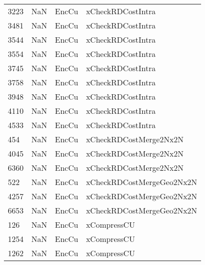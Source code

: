 \begin{tabular}{llll}
3223 &                   NaN &                      EncCu &                         xCheckRDCostIntra \\
3481 &                   NaN &                      EncCu &                         xCheckRDCostIntra \\
3544 &                   NaN &                      EncCu &                         xCheckRDCostIntra \\
3554 &                   NaN &                      EncCu &                         xCheckRDCostIntra \\
3745 &                   NaN &                      EncCu &                         xCheckRDCostIntra \\
3758 &                   NaN &                      EncCu &                         xCheckRDCostIntra \\
3948 &                   NaN &                      EncCu &                         xCheckRDCostIntra \\
4110 &                   NaN &                      EncCu &                         xCheckRDCostIntra \\
4533 &                   NaN &                      EncCu &                         xCheckRDCostIntra \\
454  &                   NaN &                      EncCu &                    xCheckRDCostMerge2Nx2N \\
4045 &                   NaN &                      EncCu &                    xCheckRDCostMerge2Nx2N \\
6360 &                   NaN &                      EncCu &                    xCheckRDCostMerge2Nx2N \\
522  &                   NaN &                      EncCu &                 xCheckRDCostMergeGeo2Nx2N \\
4257 &                   NaN &                      EncCu &                 xCheckRDCostMergeGeo2Nx2N \\
6653 &                   NaN &                      EncCu &                 xCheckRDCostMergeGeo2Nx2N \\
126  &                   NaN &                      EncCu &                               xCompressCU \\
1254 &                   NaN &                      EncCu &                               xCompressCU \\
1262 &                   NaN &                      EncCu &                               xCompressCU \\

\end{tabular}
